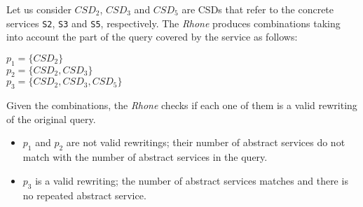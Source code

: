 Let us consider $CSD_{2}$, $CSD_{3}$ and $CSD_{5}$ are CSDs that refer to the concrete services \texttt{S2}, \texttt{S3} and \texttt{S5}, respectively. The \textit{Rhone} produces combinations taking into account the part of the query covered by the service as follows:
\begin{flushleft}
$p_{1} = \lbrace CSD_{2} \rbrace$ \\
$p_{2} = \lbrace CSD_{2}, CSD_{3} \rbrace$ \\
$p_{3} = \lbrace CSD_{2}, CSD_{3}, CSD_{5} \rbrace$
\end{flushleft}
Given the combinations, the \textit{Rhone} checks if each one of them is a valid
rewriting of the original query.
\begin{itemize}
\item $p_{1}$ and $p_{2}$ are not valid rewritings; their number of abstract services do not match with the number of abstract services in the query.
\item $p_{3}$ is a valid rewriting; the number of abstract services matches and there is no repeated abstract service. 
\end{itemize}